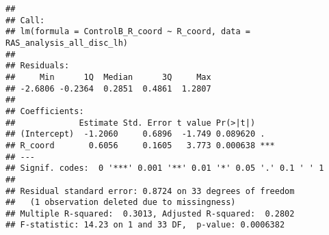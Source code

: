 \documentclass[
]{article}
\newenvironment{Shaded}{\begin{snugshade}}{\end{snugshade}}
\newcommand{\CommentTok}[1]{\textcolor[rgb]{0.56,0.35,0.01}{\textit{#1}}}
\newcommand{\DataTypeTok}[1]{\textcolor[rgb]{0.13,0.29,0.53}{#1}}
\newcommand{\KeywordTok}[1]{\textcolor[rgb]{0.13,0.29,0.53}{\textbf{#1}}}
\newcommand{\NormalTok}[1]{#1}
\newcommand{\OperatorTok}[1]{\textcolor[rgb]{0.81,0.36,0.00}{\textbf{#1}}}
\newcommand{\StringTok}[1]{\textcolor[rgb]{0.31,0.60,0.02}{#1}}
\begin{document}
\begin{Shaded}
\end{Shaded}

\begin{verbatim}
## 
## Call:
## lm(formula = ControlB_R_coord ~ R_coord, data = RAS_analysis_all_disc_lh)
## 
## Residuals:
##     Min      1Q  Median      3Q     Max 
## -2.6806 -0.2364  0.2851  0.4861  1.2807 
## 
## Coefficients:
##             Estimate Std. Error t value Pr(>|t|)    
## (Intercept)  -1.2060     0.6896  -1.749 0.089620 .  
## R_coord       0.6056     0.1605   3.773 0.000638 ***
## ---
## Signif. codes:  0 '***' 0.001 '**' 0.01 '*' 0.05 '.' 0.1 ' ' 1
## 
## Residual standard error: 0.8724 on 33 degrees of freedom
##   (1 observation deleted due to missingness)
## Multiple R-squared:  0.3013, Adjusted R-squared:  0.2802 
## F-statistic: 14.23 on 1 and 33 DF,  p-value: 0.0006382
\end{verbatim}
\end{document}
